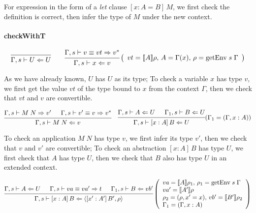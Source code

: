 \documentclass{article}
\theoremstyle{remark}
\begin{document}
For expression in the form of a \emph{let} clause $[x : A = B] \, M$, we first check the definition is correct, then infer the type of $M$ under the new context.

\paragraph{checkWithT}
\[
  \begin{prooftree}
    \infer0{\Gamma,s \vdash U \Leftarrow U}
  \end{prooftree} \quad \quad
  \begin{prooftree}
    \hypo{\Gamma,s \vdash v \equiv vt \Rightarrow v^*}
    \infer1{\Gamma,s \vdash x \Leftarrow v}
  \end{prooftree}\left(\begin{array}{l}
                         vt = \llbracket A \rrbracket \rho, \, A = \Gamma(x), \, \rho = \text{getEnv} \; s \; \Gamma
                       \end{array}\right)
\]

As we have already known, $U$ has $U$ as its type; To check a variable $x$ has type $v$, we first get the value $vt$ of the type bound to $x$ from the context $\Gamma$, then we check that $vt$ and $v$ are convertible.

\[
  \begin{prooftree}
    \hypo{\Gamma,s \vdash M \; N \Rightarrow v'}
    \hypo{\Gamma,s \vdash v' \equiv v \Rightarrow v^*}
    \infer2{\Gamma,s \vdash M \; N \Leftarrow v}
  \end{prooftree} \quad
  \begin{prooftree}
    \hypo{\Gamma,s \vdash A \Leftarrow U}
    \hypo{\Gamma_1,s \vdash B \Leftarrow U}
    \infer2{\Gamma,s \vdash [x : A] \, B \Leftarrow U}
  \end{prooftree}(\Gamma_1 = (\Gamma, x : A))
\]

To check an application $M \; N$ has type $v$, we first infer its type $v'$, then we check that $v$ and $v'$ are convertible; To check an abstraction $[x : A] \, B$ has type $U$, we first check that $A$ has type $U$, then we check that $B$ also has type $U$ in an extended context.

\[
  \begin{prooftree}
    \hypo{\Gamma,s \vdash A \Leftarrow U}
    \hypo{\Gamma,s \vdash va \equiv va' \Rightarrow t}
    \hypo{\Gamma_1,s \vdash B \Leftarrow vb'}
    \infer3{\Gamma,s \vdash [x : A] \, B \Leftarrow \langle [x' : A'] \, B', \rho \rangle}
  \end{prooftree}\left(\begin{array}{l}
                         va = \llbracket A \rrbracket \rho_1, \, \rho_1 = \text{getEnv} \; s \; \Gamma \\
                         va' = \llbracket A' \rrbracket \rho \\
                         \rho_2 = (\rho, x' = x), \, vb' = \llbracket B' \rrbracket \rho_2 \\
                         \Gamma_1 = (\Gamma, x : A)
                       \end{array}\right)
\]
\end{document}
